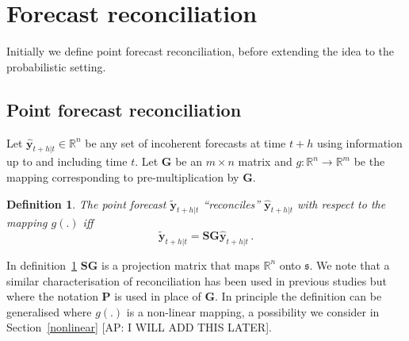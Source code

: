 \documentclass[a4paper, 11pt]{article}
\newtheorem{definition}{Definition}[section]
\begin{document}
\section{Forecast reconciliation}\label{sec:reconciliation}

Initially we define point forecast reconciliation, before extending the idea to the probabilistic setting.

\subsection{Point forecast reconciliation}


  Let $\hat{\bm{y}}_{t+h|t} \in \mathbb{R}^n$ be any set of incoherent forecasts at time $t+h$ using information up to and including time $t$.  Let $\bm{G}$ be an $m\times n$ matrix and $g:\mathbb{R}^n \rightarrow \mathbb{R}^m$ be the mapping corresponding to pre-multiplication by $\bm{G}$.
  \begin{definition}\label{def:reconpoint}
  The point forecast $\tilde{\bm{y}}_{t+h|t}$ ``reconciles'' $\hat{\bm{y}}_{t+h|t}$ with respect to the mapping $g(.)$ iff
  \begin{equation}
    \tilde{\bm{y}}_{t+h|t}=\bm{S}\bm{G}\hat{\bm{y}}_{t+h|t}\,.
  \end{equation} 
    
\end{definition}

In definition~\ref{def:reconpoint}  $\bm{S}\bm{G}$ is a projection matrix that maps $\mathbb{R}^n$ onto $\mathfrak{s}$. We note that a similar characterisation of reconciliation has been used in previous studies but where the notation $\bm{P}$ is used in place of $\bm{G}$. In principle the definition can be generalised where $g(.)$ is a non-linear mapping, a possibility we consider in Section~\ref{nonlinear} {\color{red}[AP: I WILL ADD THIS LATER]}.
\end{document}
